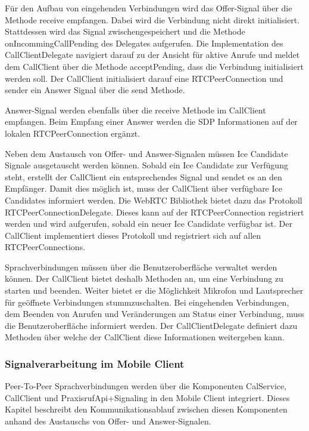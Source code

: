 Für den Aufbau von eingehenden Verbindungen wird das Offer-Signal über die Methode receive empfangen.
Dabei wird die Verbindung nicht direkt initialisiert.
Stattdessen wird das Signal zwischengespeichert und die Methode onIncommingCallPending des Delegates aufgerufen.
Die Implementation des CallClientDelegate navigiert darauf zu der Ansicht für aktive Anrufe und meldet dem CallClient über die Methode acceptPending, dass die Verbindung initialisiert werden soll.
Der CallClient initialisiert darauf eine RTCPeerConnection und sender ein Answer Signal über die send Methode.

Answer-Signal werden ebenfalls über die receive Methode im CallClient empfangen.
Beim Empfang einer Answer werden die SDP Informationen auf der lokalen RTCPeerConnection ergänzt.

Neben dem Austausch von Offer- und Answer-Signalen müssen Ice Candidate Signale ausgetauscht werden können.
Sobald ein Ice Candidate zur Verfügung steht, erstellt der CallClient ein entsprechendes Signal und sendet es an den Empfänger.
Damit dies möglich ist, muss der CallClient über verfügbare Ice Candidates informiert werden.
Die WebRTC Bibliothek bietet dazu das Protokoll RTCPeerConnectionDelegate.
Dieses kann auf der RTCPeerConnection registriert werden und wird aufgerufen, sobald ein neuer Ice Candidate verfügbar ist.
Der CallClient implementiert dieses Protokoll und registriert sich auf allen RTCPeerConnections.

Sprachverbindungen müssen über die Benutzeroberfläche verwaltet werden können.
Der CallClient bietet deshalb Methoden an, um eine Verbindung zu starten und beenden.
Weiter bietet er die Möglichkeit Mikrofon und Lautsprecher für geöffnete Verbindungen stummzuschalten.
Bei eingehenden Verbindungen, dem Beenden von Anrufen und Veränderungen am Status einer Verbindung, muss die Benutzeroberfläche informiert werden.
Der CallClientDelegate definiert dazu Methoden über welche der CallClient diese Informationen weitergeben kann.

\subsubsection{Signalverarbeitung im Mobile Client}

Peer-To-Peer Sprachverbindungen werden über die Komponenten CalService, CallClient und PraxisrufApi+Signaling in den Mobile Client integriert.
Dieses Kapitel beschreibt den Kommunikationsablauf zwischen diesen Komponenten anhand des Austauschs von Offer- und Answer-Signalen.

